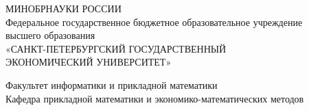 \documentclass[14pt]{extarticle}
\title{}
\author{}
\date{}
\begin{document}
\begin{titlepage}
    \begin{center}
        МИНОБРНАУКИ РОССИИ \\
        Федеральное государственное бюджетное образовательное учреждение \\
        высшего образования \\
        «САНКТ-ПЕТЕРБУРГСКИЙ ГОСУДАРСТВЕННЫЙ \\
        ЭКОНОМИЧЕСКИЙ УНИВЕРСИТЕТ» \\
        
        \vspace{0.5cm}
        
        Факультет информатики и прикладной математики
        \vspace{0.5cm}\\
        Кафедра прикладной математики и экономико-математических методов
        
        \vspace{0.5cm}
        \vspace*{0.5cm}
        

\end{center}
\end{titlepage}
\end{document}
